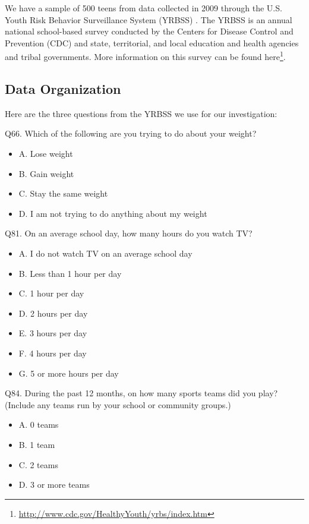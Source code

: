 \documentclass[
]{krantz}
\providecommand{\tightlist}{%
  \setlength{\itemsep}{0pt}\setlength{\parskip}{0pt}}
\renewcommand{\href}[2]{#2\footnote{\url{#1}}}
\begin{document}
We have a sample of 500 teens from data collected in 2009 through the U.S. Youth Risk Behavior Surveillance System (YRBSS) \citep{YRBS2009}. The YRBSS is an annual national school-based survey conducted by the Centers for Disease Control and Prevention (CDC) and state, territorial, and local education and health agencies and tribal governments. More information on this survey can be found \href{http://www.cdc.gov/HealthyYouth/yrbs/index.htm}{here}.

\subsection{Data Organization}\label{data-organization-4}

Here are the three questions from the YRBSS we use for our investigation:

Q66. Which of the following are you trying to do about your weight?

\begin{itemize}
\tightlist
\item
  A. Lose weight
\item
  B. Gain weight
\item
  C. Stay the same weight
\item
  D. I am not trying to do anything about my weight
\end{itemize}

Q81. On an average school day, how many hours do you watch TV?

\begin{itemize}
\tightlist
\item
  A. I do not watch TV on an average school day
\item
  B. Less than 1 hour per day
\item
  C. 1 hour per day
\item
  D. 2 hours per day
\item
  E. 3 hours per day
\item
  F. 4 hours per day
\item
  G. 5 or more hours per day
\end{itemize}

Q84. During the past 12 months, on how many sports teams did you play? (Include any teams run by your school or community groups.)

\begin{itemize}
\tightlist
\item
  A. 0 teams
\item
  B. 1 team
\item
  C. 2 teams
\item
  D. 3 or more teams
\end{itemize}
\end{document}
